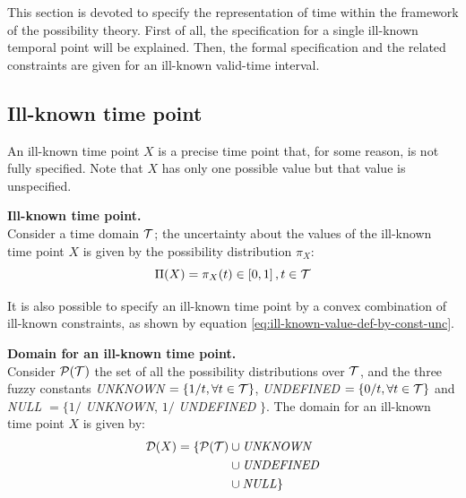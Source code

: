 %
%

This section is devoted to specify the representation of time within the framework of the possibility theory. First of all, the specification for a single ill-known temporal point will be explained. Then, the formal specification and the related constraints are given for an ill-known valid-time interval.

\subsection{\label{subsec:ill-known-point-rep}Ill-known time point}
An ill-known time point $X$ is a precise time point that, for some reason, is not fully specified. Note that $X$ has only one possible value but that value is unspecified.

\begin{definition}
\label{def:ill-known-time-point}
\textbf{Ill-known time point.}\\
Consider a time domain $\mathcal{T}$; the uncertainty about the values of the ill-known time point $X$ is given by the possibility distribution $\pi_X$:
\begin{equation}
\label{eq:ill-known-time-point}
\Pi(X) = \pi_X(t) \in \left[0,1\right] , t \in \mathcal{T}
\end{equation}
\end{definition}

It is also possible to specify an ill-known time point by a convex combination of ill-known constraints, as shown by equation \eqref{eq:ill-known-value-def-by-const-unc}.



\begin{definition}
\label{def:ill-known-domain}
\textbf{Domain for an ill-known time point.}\\
Consider $\mathcal{P}(\mathcal{T})$ the set of all the possibility distributions over $\mathcal{T}$, and the three fuzzy constants \emph{UNKNOWN} $=\left\lbrace 1/t, \forall t \in \mathcal{T} \right\rbrace$, \emph{UNDEFINED} $=\left\lbrace 0/t,\forall t \in \mathcal{T} \right\rbrace$ and \emph{NULL} $=\lbrace 1/$ \emph{UNKNOWN}, $1/$ \emph{UNDEFINED} $\rbrace$. The domain for an ill-known time point $X$ is given by: 
\begin{align}
\label{eq:ill-known-domain}
\Dom (X) =  \lbrace \Pow(\T) & \cup \mbox{\emph{UNKNOWN}} \\
\nonumber
&\cup \mbox{\emph{UNDEFINED}} \\
\nonumber
&\cup \mbox{\emph{NULL}} \rbrace
%
\end{align}
\end{definition}





